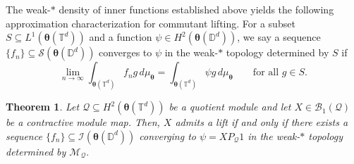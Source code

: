\documentclass[12pt,reqno]{amsart}
\newtheorem{theorem}{Theorem}[section]
\theoremstyle{remark}
\theoremstyle{definition}
\begin{document}
    The weak-$*$ density of inner functions established above yields the following approximation characterization for commutant lifting. 
    For a subset $S\subseteq L^1(\boldsymbol \theta(\mathbb T^d))$ and a function $\psi \in H^2(\boldsymbol \theta(\mathbb D^d))$, we say a sequence $\{f_n\}\subseteq \mathcal{S}(\boldsymbol \theta(\mathbb D^d))$ converges to $\psi$ in the weak-$*$ topology determined by $S$ if
$$\lim_{n\to\infty}\int_{\boldsymbol \theta(\mathbb T^d)} f_n g\, d\mu_{\boldsymbol\theta}=\int_{\boldsymbol \theta(\mathbb T^d)} \psi g\, d\mu_{\boldsymbol\theta}\qquad \text{for all } g\in S.$$    

\begin{theorem}\label{3rd characterization}
    Let  $\mathcal{Q}\subseteq H^2(\boldsymbol \theta(\mathbb T^d))$ be a quotient module and let $X\in \mathcal{B}_1(\mathcal{Q})$ be a contractive module map. Then, $X$ admits a lift if and only if there exists a sequence $\{f_n\}\subseteq \mathcal{I}(\boldsymbol \theta(\mathbb D^d))$ converging to $\psi=XP_{\mathcal{Q}}1$ in the weak-$*$ topology determined by $\mathcal{M}_{\mathcal{Q}}.$
\end{theorem}
\end{document}
